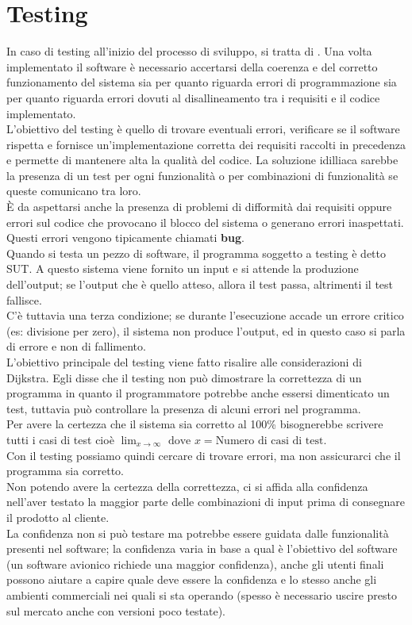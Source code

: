 \section{Testing}
\label{sec:07_testing}
In caso di testing all'inizio del processo di sviluppo, si tratta di .
Una volta implementato il software è necessario accertarsi della coerenza e del corretto funzionamento del sistema sia per quanto riguarda errori di programmazione sia per quanto riguarda errori dovuti al disallineamento tra i requisiti e il codice implementato.\\
L'obiettivo del testing è quello di trovare eventuali errori, verificare se il software rispetta e fornisce un'implementazione corretta dei requisiti raccolti in precedenza e permette di mantenere alta la qualità del codice.
La soluzione idilliaca sarebbe la presenza di un test per ogni funzionalità o per combinazioni di funzionalità se queste comunicano tra loro.\\
È da aspettarsi anche la presenza di problemi di difformità dai requisiti oppure errori sul codice che provocano il blocco del sistema o generano errori inaspettati.
Questi errori vengono tipicamente chiamati \textbf{bug}.\\
Quando si testa un pezzo di software, il programma soggetto a testing è detto \acrfull{SUT}.
A questo sistema viene fornito un input e si attende la produzione dell'output; se l'output che è quello atteso, allora il test passa, altrimenti il test fallisce.\\
C'è tuttavia una terza condizione; se durante l'esecuzione accade un errore critico (es: divisione per zero), il sistema non produce l'output, ed in questo caso si parla di errore e non di fallimento.\\
L'obiettivo principale del testing viene fatto risalire alle considerazioni di Dijkstra.
Egli disse che il testing non può dimostrare la correttezza di un programma in quanto il programmatore potrebbe anche essersi dimenticato un test, tuttavia può controllare la presenza di alcuni errori nel programma.\\
Per avere la certezza che il sistema sia corretto al 100\% bisognerebbe scrivere tutti i casi di test cioè $\lim_{x \to \infty}\textrm{ dove }x = \textrm{Numero di casi di test}$.\\
Con il testing possiamo quindi cercare di trovare errori, ma non assicurarci che il programma sia corretto.\\
Non potendo avere la certezza della correttezza, ci si affida alla confidenza nell'aver testato la maggior parte delle combinazioni di input prima di consegnare il prodotto al cliente.\\
La confidenza non si può testare ma potrebbe essere guidata dalle funzionalità presenti nel software; la confidenza varia in base a qual è l'obiettivo del software (un software avionico richiede una maggior confidenza), anche gli utenti finali possono aiutare a capire quale deve essere la confidenza e lo stesso anche gli ambienti commerciali nei quali si sta operando (spesso è necessario uscire presto sul mercato anche con versioni poco testate).

